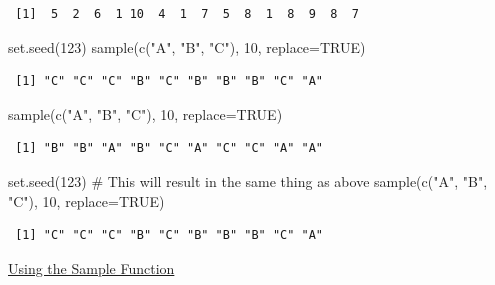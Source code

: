\documentclass[
  letterpaper,
  DIV=11,
  numbers=noendperiod]{scrreprt}
\newenvironment{Shaded}{\begin{snugshade}}{\end{snugshade}}
\newcommand{\AttributeTok}[1]{\textcolor[rgb]{0.40,0.45,0.13}{#1}}
\newcommand{\CommentTok}[1]{\textcolor[rgb]{0.37,0.37,0.37}{#1}}
\newcommand{\ConstantTok}[1]{\textcolor[rgb]{0.56,0.35,0.01}{#1}}
\newcommand{\DecValTok}[1]{\textcolor[rgb]{0.68,0.00,0.00}{#1}}
\newcommand{\FunctionTok}[1]{\textcolor[rgb]{0.28,0.35,0.67}{#1}}
\newcommand{\NormalTok}[1]{\textcolor[rgb]{0.00,0.23,0.31}{#1}}
\newcommand{\StringTok}[1]{\textcolor[rgb]{0.13,0.47,0.30}{#1}}
\begin{document}
\begin{verbatim}
 [1]  5  2  6  1 10  4  1  7  5  8  1  8  9  8  7
\end{verbatim}

\begin{Shaded}
\begin{Highlighting}[]
\FunctionTok{set.seed}\NormalTok{(}\DecValTok{123}\NormalTok{)}
\FunctionTok{sample}\NormalTok{(}\FunctionTok{c}\NormalTok{(}\StringTok{"A"}\NormalTok{, }\StringTok{"B"}\NormalTok{, }\StringTok{"C"}\NormalTok{), }\DecValTok{10}\NormalTok{, }\AttributeTok{replace=}\ConstantTok{TRUE}\NormalTok{)}
\end{Highlighting}
\end{Shaded}

\begin{verbatim}
 [1] "C" "C" "C" "B" "C" "B" "B" "B" "C" "A"
\end{verbatim}

\begin{Shaded}
\begin{Highlighting}[]
\FunctionTok{sample}\NormalTok{(}\FunctionTok{c}\NormalTok{(}\StringTok{"A"}\NormalTok{, }\StringTok{"B"}\NormalTok{, }\StringTok{"C"}\NormalTok{), }\DecValTok{10}\NormalTok{, }\AttributeTok{replace=}\ConstantTok{TRUE}\NormalTok{)}
\end{Highlighting}
\end{Shaded}

\begin{verbatim}
 [1] "B" "B" "A" "B" "C" "A" "C" "C" "A" "A"
\end{verbatim}

\begin{Shaded}
\begin{Highlighting}[]
\FunctionTok{set.seed}\NormalTok{(}\DecValTok{123}\NormalTok{) }\CommentTok{\# This will result in the same thing as above}
\FunctionTok{sample}\NormalTok{(}\FunctionTok{c}\NormalTok{(}\StringTok{"A"}\NormalTok{, }\StringTok{"B"}\NormalTok{, }\StringTok{"C"}\NormalTok{), }\DecValTok{10}\NormalTok{, }\AttributeTok{replace=}\ConstantTok{TRUE}\NormalTok{)}
\end{Highlighting}
\end{Shaded}

\begin{verbatim}
 [1] "C" "C" "C" "B" "C" "B" "B" "B" "C" "A"
\end{verbatim}

\begin{watch}{}{}
    \href{https://youtu.be/8JwzbwIki-g}{Using the Sample Function}
\end{watch}
\end{document}
